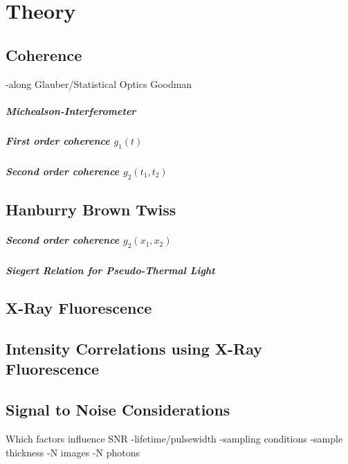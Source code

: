 \chapter{Theory}

\section{Coherence}
-along Glauber/Statistical Optics Goodman


\paragraph{Michealson-Interferometer}
\paragraph{First order coherence $g_1(t)$}
\paragraph{Second order coherence $g_2(t_1,t_2)$}


\section{Hanburry Brown Twiss}
\paragraph{Second order coherence $g_2(x_1,x_2)$}
\paragraph{Siegert Relation for Pseudo-Thermal Light}

\section{X-Ray Fluorescence}

\section{Intensity Correlations using X-Ray Fluorescence}
\section{Signal to Noise Considerations}
Which factors influence SNR
-lifetime/pulsewidth
-sampling conditions
-sample thickness
-N images
-N photons
\label{chap:theory}


